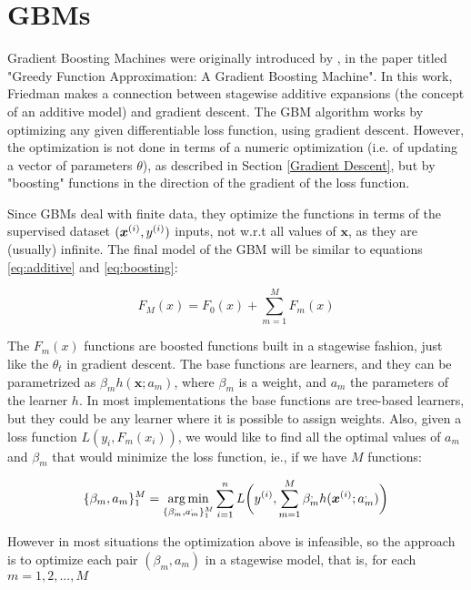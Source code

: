 \section{GBMs}

Gradient Boosting Machines were originally introduced by \cite{gbmdef}, in the paper titled "Greedy Function Approximation: A Gradient Boosting Machine". In this work, Friedman makes a connection between stagewise additive expansions (the concept of an additive model) and gradient descent. The GBM algorithm works by optimizing any given differentiable loss function, using gradient descent. However, the optimization is not done in terms of a numeric optimization (i.e. of updating a vector of parameters $\theta$), as described in Section \ref{Gradient Descent}, but by "boosting" functions in the direction of the gradient of the loss function.

Since GBMs deal with finite data, they optimize the functions in terms of the supervised dataset $(\bm{x}^{(i)},y^{(i)})$ inputs, not w.r.t all values of $\bm{x}$, as they are (usually) infinite. The final model of the GBM will be similar to equations \ref{eq:additive} and \ref{eq:boosting}:

\begin{equation}\label{eq:gbm-1}
    F_M(x) = F_0(x) + \sum_{m=1}^M F_m(x)
\end{equation}

\noindent The $F_m(x)$ functions are boosted functions built in a stagewise fashion, just like the $\theta_t$ in gradient descent. The base functions are learners, and they can be parametrized as $\beta_mh(\bm{x};a_m)$, where $\beta_m$ is a weight, and $a_m$ the parameters of the learner $h$. In most implementations the base functions are tree-based learners, but they could be any learner where it is possible to assign weights. Also, given a loss function $L(y_i, F_m(x_i))$, we would like to find all the optimal values of $a_m$ and $\beta_m$ that would minimize the loss function, ie., if we have $M$ functions:

\begin{equation*}
\{\beta_m, a_m\}_1^M = \argmin_{\{\beta_m^\apsimple, a_m^\apsimple\}_1^M} \sum_{i=1}^n L\bigg(\yisup, \sum_{m=1}^M \beta_m^\apsimple h(\xisup;a_m^\apsimple)\bigg)
\end{equation*}

\noindent However in most situations the optimization above is infeasible, so the  approach is to optimize each pair $(\beta_m, a_m)$ in a stagewise model, that is, for each $m = 1, 2, ..., M$

